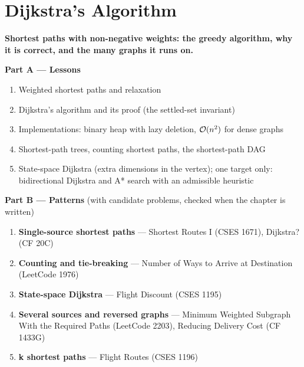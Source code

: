 \chapter{Dijkstra's Algorithm}
\label{ch:dijkstra}

\begin{tcolorbox}[enhanced, colback=white, colframe=secondaryblue, boxrule=1pt, arc=2mm]
\textbf{\large\textcolor{primaryblue}{Shortest paths with non-negative weights: the greedy algorithm, why it is correct, and the many graphs it runs on.}}
\end{tcolorbox}


\begin{plannedbox}
\textbf{Part A --- Lessons}
\begin{enumerate}[leftmargin=*, label=\textbf{A\arabic*.}, itemsep=1pt]
    \item Weighted shortest paths and relaxation
    \item Dijkstra's algorithm and its proof (the settled-set invariant)
    \item Implementations: binary heap with lazy deletion, $\mathcal{O}(n^2)$ for dense graphs
    \item Shortest-path trees, counting shortest paths, the shortest-path DAG
    \item State-space Dijkstra (extra dimensions in the vertex); one target only: bidirectional Dijkstra and A* search with an admissible heuristic
\end{enumerate}
\textbf{Part B --- Patterns} (with candidate problems, checked when the chapter is written)
\begin{enumerate}[leftmargin=*, label=\textbf{P\arabic*.}, itemsep=1pt]
    \item \textbf{Single-source shortest paths} --- Shortest Routes I {\small\color{darkgray}(CSES 1671)}, Dijkstra? {\small\color{darkgray}(CF 20C)}
    \item \textbf{Counting and tie-breaking} --- Number of Ways to Arrive at Destination {\small\color{darkgray}(LeetCode 1976)}
    \item \textbf{State-space Dijkstra} --- Flight Discount {\small\color{darkgray}(CSES 1195)}
    \item \textbf{Several sources and reversed graphs} --- Minimum Weighted Subgraph With the Required Paths {\small\color{darkgray}(LeetCode 2203)}, Reducing Delivery Cost {\small\color{darkgray}(CF 1433G)}
    \item \textbf{k shortest paths} --- Flight Routes {\small\color{darkgray}(CSES 1196)}
\end{enumerate}
\end{plannedbox}
